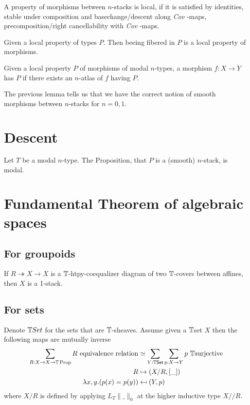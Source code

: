 \documentclass{article}
\newcommand{\Cov}{\emph{Cov} }
\begin{document}
\begin{definition}
    A property of morphisms between  $n$-stacks is local, if it is satisfied by identities, stable under composition and basechange/descent along \Cov-maps, precomposition/right cancellability with \Cov-maps.
\end{definition}
\begin{lemma}
    Given a local property of types $P$. Then beeing fibered in $P$ is a local property of morphisms.
\end{lemma}
\begin{lemma}
    Given a local property $P$ of morphisms of modal $n$-types, a morphism $f : X \to Y$ has $P$ if there exists an $n$-atlas of $f$ having $P$.
\end{lemma}
The previous lemma tells us that we have the correct notion of smooth morphisms between  $n$-stacks for $n = 0,1$.
\section{Descent}
 \begin{theorem}{\label{thm:descent}}
     Let $T$ be a modal $n$-type. The Proposition, that $P$ is a  (smooth) $n$-stack, is modal.
 \end{theorem}
\section{Fundamental Theorem of algebraic spaces}
\subsection{For groupoids}
\begin{lemma}
    If $R \twoheadrightarrow X \to X$ is a $\mathbb{T}$-htpy-coequalizer diagram of two $\mathbb{T}$-covers between affines, then $X$ is a  1-stack.
\end{lemma}

\subsection{For sets}
\begin{lemma}\label{quotient-by-equivalence-relation}
Denote $\mathbb{T} Set$ for the sets that are $\mathbb{T}$-sheaves. Assume given a $\mathbb{T}$set  $X$ then the following maps are mutually inverse
\begin{align*}
\sum_{R:X\to X\to \bT\Prop} R\ \mathrm{equivalence\ relation} &\simeq \sum_{Y:\bT \mathrm{\Set}} \sum_{p:X\to Y} p\ \bT\mathrm{surjective} \\
R &\mapsto (X/R,[\_]) \\
 \lambda x,y.  (p(x)=p(y)) &\mapsfrom (Y,p) 
 \end{align*}
where $X / R$ is defined by applying $L_T \| \_ \|_0 $ at the higher inductive type $X // R$.
\end{lemma}
\end{document}
